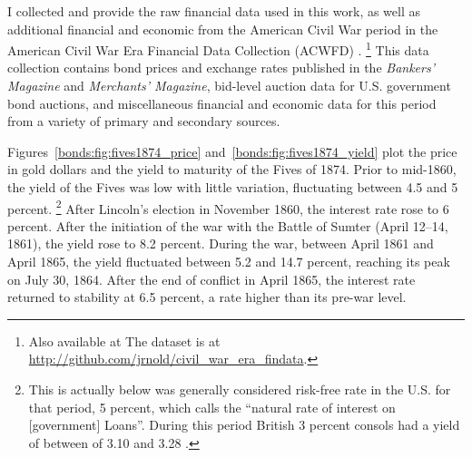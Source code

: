 I collected and provide the raw financial data used in this work, as well as additional financial and economic from the American Civil War period in the American Civil War Era Financial Data Collection (ACWFD) \parencite{Arnold2015a}.%
\footnote{Also available at The dataset is at \url{http://github.com/jrnold/civil_war_era_findata}.}
This data collection contains bond prices and exchange rates published in the \textit{Bankers' Magazine} and \textit{Merchants' Magazine}, bid-level auction data for U.S. government bond auctions, and miscellaneous financial and economic data for this period from a variety of primary and secondary sources.

Figures~\ref{bonds:fig:fives1874_price} and~\ref{bonds:fig:fives1874_yield} plot the price in gold dollars and the yield to maturity of the Fives of 1874.
Prior to mid-1860, the yield of the Fives was low with little variation, fluctuating between 4.5 and 5 percent.%
\footnote{
  This is actually below was generally considered risk-free rate in the U.S. for that period, 5 percent, which \textcite[29]{Elder1863} calls the ``natural rate of interest on [government] Loans''.
  During this period British 3 percent consols had a yield of between of 3.10 and 3.28 \parencite[193]{HomerSylla2005}.
}
After Lincoln's election in November 1860,  the interest rate rose to 6 percent.
After the initiation of the war with the Battle of Sumter (April 12--14, 1861), the yield rose to 8.2 percent.
During the war, between April 1861 and April 1865, the yield fluctuated between 5.2 and 14.7 percent, reaching its peak on July 30, 1864.
After the end of conflict in April 1865, the interest rate returned to stability at 6.5 percent, a rate higher than its pre-war level.


